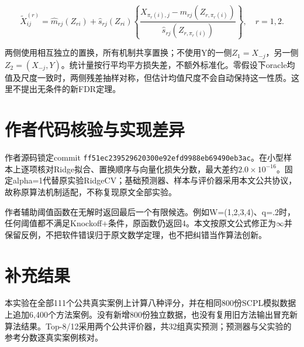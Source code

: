 \documentclass{sufethesismas}
\begin{document}
\[
\widetilde X^{(r)}_{ij}
=\widehat m_{rj}(Z_{ri})+
\widehat s_{rj}(Z_{ri})
\left\{\frac{X_{\pi_r(i),j}-\widehat m_{rj}(Z_{r,\pi_r(i)})}
{\widehat s_{rj}(Z_{r,\pi_r(i)})}\right\},\quad r=1,2.
\]

两侧使用相互独立的置换，所有机制共享置换；不使用Y的一侧\(Z_1=X_{-j}\)，另一侧\(Z_2=(X_{-j},Y)\)。统计量按行平均平方损失差，不额外标准化。零假设下oracle均值及尺度一致时，两侧残差抽样对称，但估计均值尺度不会自动保持这一性质。这里不提出无条件的新FDR定理。

\section{作者代码核验与实现差异}

作者源码锁定commit \texttt{ff51ec239529620300e92efd9988eb69490eb3ac}。在小型样本上逐项核对Ridge拟合、置换顺序与向量化损失分数，最大差约\(2.0\times10^{-16}\)。固定alpha=1代替原实验RidgeCV；基础预测器、样本与评价器采用本文公共协议，故称原算法机制适配，不称复现原文全部实验。

作者辅助阈值函数在无解时返回最后一个有限候选。例如W=(1,2,3,4)、q=.2时，任何阈值都不满足Knockoff+条件，原函数仍返回4。本文按原文公式修正为\(\infty\)并保留反例，不把软件错误归于原文数学定理，也不把纠错当作算法创新。

\section{补充结果}

本实验在全部111个公共真实案例上计算八种评分，并在相同800份SCPL模拟数据上追加6,400个方法案例。没有新增800份独立数据，也没有复用旧方法输出冒充新算法结果。Top-8/12采用两个公共评价器，共32组真实预测；预测器与父实验的参考分数逐真实案例核对。
\end{document}
